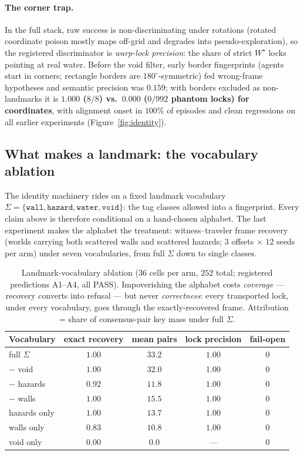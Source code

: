 \documentclass{article}
\newcommand{\wstar}{W^{\star}}
\begin{document}
\paragraph{The corner trap.} In the full stack, raw success is
non-discriminating under rotations (rotated coordinate poison mostly
maps off-grid and degrades into pseudo-exploration), so the
registered discriminator is \emph{warp-lock precision}: the share of
strict $\wstar$ locks pointing at real water. Before the void filter,
early border fingerprints (agents start in corners; rectangle borders
are $180^\circ$-symmetric) fed wrong-frame hypotheses and semantic
precision was $0.159$; with borders excluded as non-landmarks it is
\textbf{$1.000$ ($8/8$) vs.\ $0.000$ ($0/992$ phantom locks) for
coordinates}, with alignment onset in $100\%$ of episodes and clean
regressions on all earlier experiments
(Figure~\ref{fig:identity}).

\subsection{What makes a landmark: the vocabulary ablation}
\label{sec:ablation}

The identity machinery rides on a fixed landmark vocabulary $\Sigma =
\{\texttt{wall}, \texttt{hazard}, \texttt{water}, \texttt{void}\}$:
the tag classes allowed into a fingerprint. Every claim above is
therefore conditional on a hand-chosen alphabet. The last experiment
makes the alphabet the treatment: witness--traveler frame recovery
(worlds carrying both scattered walls and scattered hazards; $3$
offsets $\times$ $12$ seeds per arm) under seven vocabularies, from
full $\Sigma$ down to single classes.

\begin{table}[h]
\centering
\caption{Landmark-vocabulary ablation ($36$ cells per arm, $252$
total; registered predictions A1--A4, all PASS). Impoverishing the
alphabet costs \emph{coverage} --- recovery converts into refusal ---
but never \emph{correctness}: every transported lock, under every
vocabulary, goes through the exactly-recovered frame. Attribution =
share of consensus-pair key mass under full $\Sigma$.}
\label{tab:ablation}
\small
\begin{tabular}{lcccc}
\toprule
Vocabulary & exact recovery & mean pairs & lock precision & fail-open \\
\midrule
full $\Sigma$ & $1.00$ & $33.2$ & $1.00$ & $0$ \\
$-$ void & $1.00$ & $32.0$ & $1.00$ & $0$ \\
$-$ hazards & $0.92$ & $11.8$ & $1.00$ & $0$ \\
$-$ walls & $1.00$ & $15.5$ & $1.00$ & $0$ \\
hazards only & $1.00$ & $13.7$ & $1.00$ & $0$ \\
walls only & $0.83$ & $10.8$ & $1.00$ & $0$ \\
void only & $0.00$ & $0.0$ & --- & $0$ \\
\bottomrule
\end{tabular}
\end{table}
\end{document}
